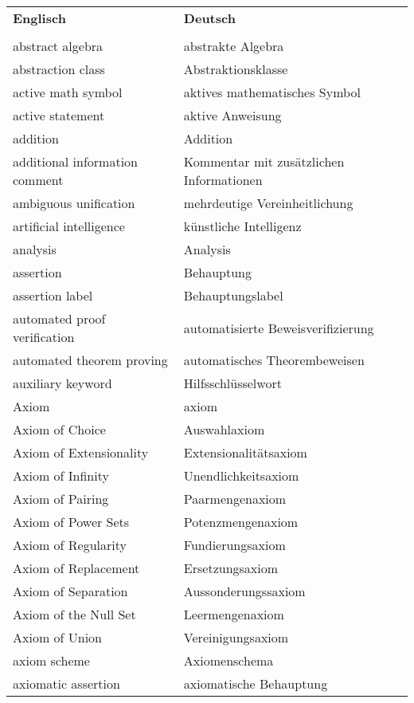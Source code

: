 \begin{longtabu}   { @{} X[l] X[l] }
\textbf{Englisch} & \textbf{Deutsch}\\
& \\
\endhead
    abstract algebra & abstrakte Algebra \\
    abstraction class & Abstraktionsklasse \\
    active math symbol & aktives mathematisches Symbol \\
    active statement & aktive Anweisung \\
    addition & Addition \\
    additional information comment & \hangindent=0.5cm Kommentar mit zusätzlichen Informationen\vspace{3pt} \\
    ambiguous unification & mehrdeutige Vereinheitlichung \\
    artificial intelligence & künstliche Intelligenz \\
    analysis & Analysis \\
    assertion & Behauptung \\
    assertion label & Behauptungslabel \\
    automated proof verification & automatisierte Beweisverifizierung \\
    automated theorem proving & automatisches Theorembeweisen \\
    auxiliary keyword & Hilfsschlüsselwort \\
    Axiom & axiom \\
    Axiom of Choice & Auswahlaxiom \\
    Axiom of Extensionality & Extensionalitätsaxiom \\
    Axiom of Infinity & Unendlichkeitsaxiom \\
    Axiom of Pairing & Paarmengenaxiom \\
    Axiom of Power Sets & Potenzmengenaxiom \\
    Axiom of Regularity & Fundierungsaxiom \\
    Axiom of Replacement & Ersetzungsaxiom \\
    Axiom of Separation & Aussonderungssaxiom \\
    Axiom of the Null Set & Leermengenaxiom \\
    Axiom of Union & Vereinigungsaxiom \\
    axiom scheme & Axiomenschema \\
    axiomatic assertion & axiomatische Behauptung \\

\end{longtabu}
